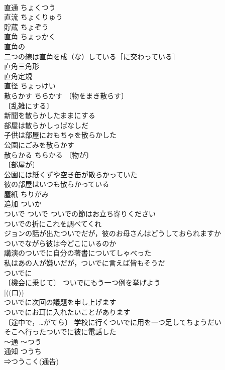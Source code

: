 \documentclass[8pt]{extreport}
\begin{document}
\begin{CJK}{UTF8}{min}
\\	直通	ちょくつう	
\\	直流	ちょくりゅう	
\\	貯蔵	ちょぞう	
\\	直角	ちょっかく	
\\	直角の 
\\	二つの線は直角を成（な）している［に交わっている］ 
\\	直角三角形 
\\	直角定規 
\\	直径	ちょっけい	
\\	散らかす	ちらかす	〔物をまき散らす〕
\\	〔乱雑にする〕
\\	新聞を散らかしたままにする 
\\	部屋は散らかしっぱなしだ 
\\	子供は部屋におもちゃを散らかした 
\\	公園にごみを散らかす 
\\	散らかる	ちらかる	〔物が〕
\\	〔部屋が〕
\\	公園には紙くずや空き缶が散らかっていた 
\\	彼の部屋はいつも散らかっている 
\\	塵紙	ちりがみ	
\\	追加	ついか	
\\	ついで	ついで	ついでの節はお立ち寄りください 
\\	ついでの折にこれを調べてくれ 
\\	ジョンの話が出たついでだが，彼のお母さんはどうしておられますか 
\\	ついでながら彼は今どこにいるのか 
\\	講演のついでに自分の著書についてしゃべった 
\\	私はあの人が嫌いだが，ついでに言えば皆もそうだ 
\\	ついでに 
\\	〔機会に乗じて〕 ついでにもう一つ例を挙げよう 
\\	[((口))
\\	ついでに次回の議題を申し上げます 
\\	ついでにお耳に入れたいことがあります 
\\	〔途中で，…がてら〕 学校に行くついでに用を一つ足してちょうだい 
\\	そこへ行ったついでに彼に電話した 
\\	～通	～つう	
\\	通知	つうち	
\\	⇒つうこく(通告)　

\end{CJK}
\end{document}
